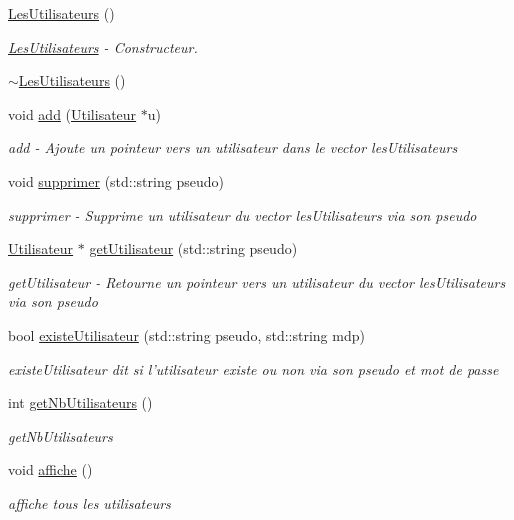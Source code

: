 \begin{DoxyCompactItemize}
\item 
\hyperlink{class_les_utilisateurs_a259a566889379f68f0e7f51fd2f4937b}{Les\-Utilisateurs} ()
\begin{DoxyCompactList}\small\item\em \hyperlink{class_les_utilisateurs}{Les\-Utilisateurs} -\/ Constructeur. \end{DoxyCompactList}\item 
\hyperlink{class_les_utilisateurs_a6968c708c6df8a1667da075d53a70758}{$\sim$\-Les\-Utilisateurs} ()
\item 
void \hyperlink{class_les_utilisateurs_ab5c478d010984c3357b3d6ea67460b8e}{add} (\hyperlink{class_utilisateur}{Utilisateur} $\ast$u)
\begin{DoxyCompactList}\small\item\em add -\/ Ajoute un pointeur vers un utilisateur dans le vector les\-Utilisateurs \end{DoxyCompactList}\item 
void \hyperlink{class_les_utilisateurs_a3ce112f12307d71f0d9cb74bc2cb506a}{supprimer} (std\-::string pseudo)
\begin{DoxyCompactList}\small\item\em supprimer -\/ Supprime un utilisateur du vector les\-Utilisateurs via son pseudo \end{DoxyCompactList}\item 
\hyperlink{class_utilisateur}{Utilisateur} $\ast$ \hyperlink{class_les_utilisateurs_a7246fbe92f69bf2940a713430c56aa31}{get\-Utilisateur} (std\-::string pseudo)
\begin{DoxyCompactList}\small\item\em get\-Utilisateur -\/ Retourne un pointeur vers un utilisateur du vector les\-Utilisateurs via son pseudo \end{DoxyCompactList}\item 
bool \hyperlink{class_les_utilisateurs_a0a06030c9a660be944b00a9300ae2044}{existe\-Utilisateur} (std\-::string pseudo, std\-::string mdp)
\begin{DoxyCompactList}\small\item\em existe\-Utilisateur dit si l'utilisateur existe ou non via son pseudo et mot de passe \end{DoxyCompactList}\item 
int \hyperlink{class_les_utilisateurs_ad825cc92534444913bf5f42416abd562}{get\-Nb\-Utilisateurs} ()
\begin{DoxyCompactList}\small\item\em get\-Nb\-Utilisateurs \end{DoxyCompactList}\item 
void \hyperlink{class_les_utilisateurs_a88613e64e91ce36d0566cc7dfd3ed12d}{affiche} ()
\begin{DoxyCompactList}\small\item\em affiche tous les utilisateurs \end{DoxyCompactList}\end{DoxyCompactItemize}
